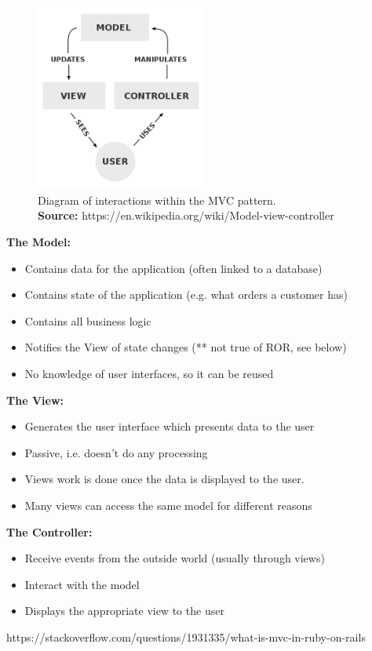 \begin{figure}[H]
	\centering
    \includegraphics[trim={0 0 0 0},clip,width=0.5\textwidth]{Files/MVC.png}
    \caption{Diagram of interactions within the MVC pattern.\\ \textbf{Source:} https://en.wikipedia.org/wiki/Model-view-controller}
    \label{fig: MVC}
\end{figure}




\textbf{The Model:}
\vspace{-5mm}
\begin{itemize}
 \setlength{\itemsep}{-5pt}
\item Contains data for the application (often linked to a database)
\item Contains state of the application (e.g. what orders a customer has)
\item  Contains all business logic
\item Notifies the View of state changes (** not true of ROR, see below)
\item No knowledge of user interfaces, so it can be reused
\end{itemize}

\textbf{The View:}
\vspace{-5mm}
\begin{itemize}
 \setlength{\itemsep}{-5pt}
\item Generates the user interface which presents data to the user
\item Passive, i.e. doesn’t do any processing
\item Views work is done once the data is displayed to the user.
\item Many views can access the same model for different reasons
\end{itemize}

\textbf{The Controller:}
\vspace{-5mm}
\begin{itemize}
 \setlength{\itemsep}{-5pt}
\item Receive events from the outside world (usually through views)
\item Interact with the model
\item Displays the appropriate view to the user
\end{itemize}

https://stackoverflow.com/questions/1931335/what-is-mvc-in-ruby-on-rails




